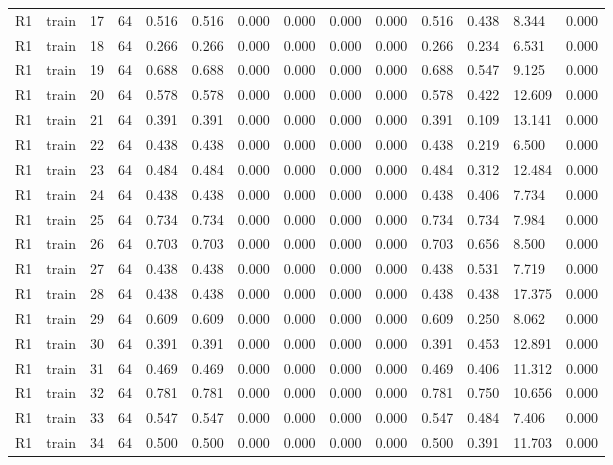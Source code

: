 \begin{table}[t]
\begin{tabular}{llllllllllllll}
R1 & train & 17 & 64 & 0.516 & 0.516 & 0.000 & 0.000 & 0.000 & 0.000 & 0.516 & 0.438 & 8.344 & 0.000 \\
R1 & train & 18 & 64 & 0.266 & 0.266 & 0.000 & 0.000 & 0.000 & 0.000 & 0.266 & 0.234 & 6.531 & 0.000 \\
R1 & train & 19 & 64 & 0.688 & 0.688 & 0.000 & 0.000 & 0.000 & 0.000 & 0.688 & 0.547 & 9.125 & 0.000 \\
R1 & train & 20 & 64 & 0.578 & 0.578 & 0.000 & 0.000 & 0.000 & 0.000 & 0.578 & 0.422 & 12.609 & 0.000 \\
R1 & train & 21 & 64 & 0.391 & 0.391 & 0.000 & 0.000 & 0.000 & 0.000 & 0.391 & 0.109 & 13.141 & 0.000 \\
R1 & train & 22 & 64 & 0.438 & 0.438 & 0.000 & 0.000 & 0.000 & 0.000 & 0.438 & 0.219 & 6.500 & 0.000 \\
R1 & train & 23 & 64 & 0.484 & 0.484 & 0.000 & 0.000 & 0.000 & 0.000 & 0.484 & 0.312 & 12.484 & 0.000 \\
R1 & train & 24 & 64 & 0.438 & 0.438 & 0.000 & 0.000 & 0.000 & 0.000 & 0.438 & 0.406 & 7.734 & 0.000 \\
R1 & train & 25 & 64 & 0.734 & 0.734 & 0.000 & 0.000 & 0.000 & 0.000 & 0.734 & 0.734 & 7.984 & 0.000 \\
R1 & train & 26 & 64 & 0.703 & 0.703 & 0.000 & 0.000 & 0.000 & 0.000 & 0.703 & 0.656 & 8.500 & 0.000 \\
R1 & train & 27 & 64 & 0.438 & 0.438 & 0.000 & 0.000 & 0.000 & 0.000 & 0.438 & 0.531 & 7.719 & 0.000 \\
R1 & train & 28 & 64 & 0.438 & 0.438 & 0.000 & 0.000 & 0.000 & 0.000 & 0.438 & 0.438 & 17.375 & 0.000 \\
R1 & train & 29 & 64 & 0.609 & 0.609 & 0.000 & 0.000 & 0.000 & 0.000 & 0.609 & 0.250 & 8.062 & 0.000 \\
R1 & train & 30 & 64 & 0.391 & 0.391 & 0.000 & 0.000 & 0.000 & 0.000 & 0.391 & 0.453 & 12.891 & 0.000 \\
R1 & train & 31 & 64 & 0.469 & 0.469 & 0.000 & 0.000 & 0.000 & 0.000 & 0.469 & 0.406 & 11.312 & 0.000 \\
R1 & train & 32 & 64 & 0.781 & 0.781 & 0.000 & 0.000 & 0.000 & 0.000 & 0.781 & 0.750 & 10.656 & 0.000 \\
R1 & train & 33 & 64 & 0.547 & 0.547 & 0.000 & 0.000 & 0.000 & 0.000 & 0.547 & 0.484 & 7.406 & 0.000 \\
R1 & train & 34 & 64 & 0.500 & 0.500 & 0.000 & 0.000 & 0.000 & 0.000 & 0.500 & 0.391 & 11.703 & 0.000 \\

\end{tabular}
\end{table}
